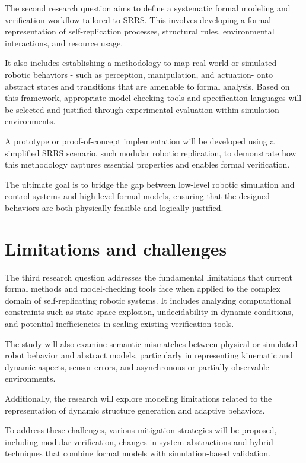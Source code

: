 The second research question aims to define a systematic formal modeling 
and verification workflow tailored to SRRS. 
This involves developing a formal representation of 
self-replication processes, structural rules, environmental interactions, 
and resource usage. 

It also includes establishing a methodology to map real-world 
or simulated robotic behaviors - such as perception, manipulation, and actuation- onto 
abstract states and transitions that are amenable to formal analysis. 
Based on this framework, appropriate model-checking tools and specification 
languages will be selected and justified through experimental evaluation within 
simulation environments. 

A prototype or proof-of-concept implementation will be developed 
using a simplified SRRS scenario, such modular robotic replication, 
to demonstrate how this methodology captures essential properties and enables formal verification. 

The ultimate goal is to bridge the gap between low-level robotic simulation and control 
systems and high-level formal models, ensuring that the designed 
behaviors are both physically feasible and logically justified.


\section{Limitations and challenges}


The third research question addresses the fundamental limitations that 
current formal methods and model-checking tools face when applied to the 
complex domain of self-replicating robotic systems.
It includes analyzing computational constraints such as state-space explosion, 
undecidability in dynamic conditions, and potential inefficiencies in scaling existing verification tools. 

The study will also examine semantic mismatches between physical 
or simulated robot behavior and abstract models, particularly in representing kinematic 
and dynamic aspects, sensor errors, and asynchronous or partially 
observable environments. 

Additionally, the research will explore modeling limitations related 
to the representation of dynamic structure generation and adaptive behaviors.

To address these challenges, various mitigation strategies will be proposed,
including modular verification, changes in system abstractions  
and hybrid techniques that combine formal models with simulation-based validation. 

